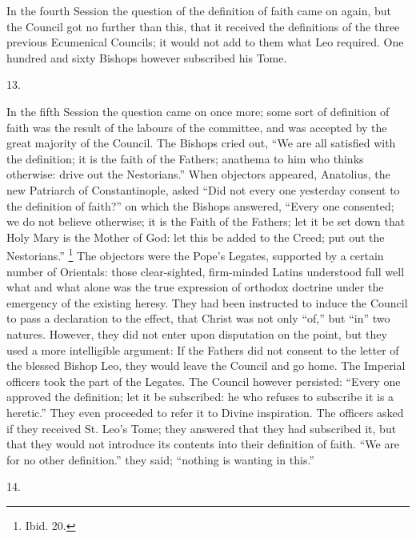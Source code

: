 In the fourth Session the question of the definition of faith came
on again, but the Council got no further than this, that it received
the definitions of the three previous Ecumenical Councils; it would
not add to them what Leo required. One hundred and sixty Bishops
however subscribed his Tome.

13.

In the fifth Session the question came on once more; some sort of
definition of faith was the result of the labours of the committee,
and was accepted by the great majority of the Council. The Bishops
cried out, ``We are all satisfied with the definition; it is the
faith of the Fathers; anathema to him who thinks otherwise: drive out
the Nestorians.'' When objectors appeared, Anatolius, the new
Patriarch of Constantinople, asked ``Did not every one yesterday
consent to the definition of faith?'' on which the Bishops
answered, ``Every one consented; we do not believe otherwise; it
is the Faith of the Fathers; let it be set down that Holy Mary is the
Mother of God: let this be added to the Creed; put out the
Nestorians.'' \footnote{Ibid. 20.} The
objectors were the Pope's Legates, supported by a certain number of
Orientals: those clear-sighted, firm-minded Latins understood full
well what and what alone was the true expression of orthodox doctrine
under the emergency of the existing heresy. They had been instructed
to induce the Council to pass a declaration to the effect, that Christ
was not only ``of,'' but ``in'' two natures. However,
they did not enter upon disputation on the point, but they used a more
intelligible argument: If the Fathers did not consent to the letter of
the blessed Bishop Leo, they would leave the Council and go home. The
Imperial officers took the part of the Legates. The Council however
persisted: ``Every one approved the definition; let it be
subscribed: he who refuses to subscribe it is a heretic.'' They
even proceeded to refer it to Divine inspiration. The officers asked
if they received St. Leo's Tome; they answered that they had
subscribed it, but that they would not introduce its contents into
their definition of faith. ``We are for no other definition.''
they said; ``nothing is wanting in this.''

14.

